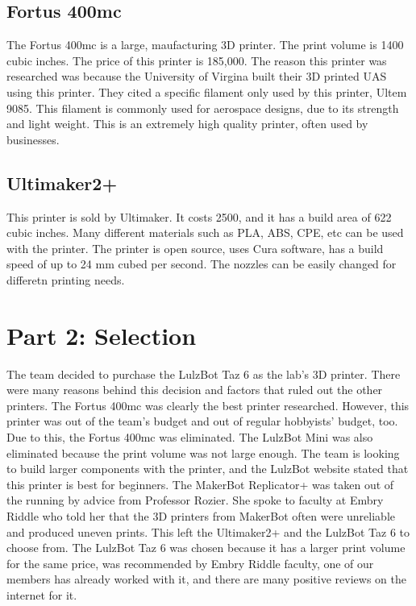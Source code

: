 \documentclass{article}
\begin{document}
\subsection*{Fortus 400mc}
The Fortus 400mc is a large, maufacturing 3D printer. The print volume is 1400 cubic inches. The price of this printer is 185,000. The reason this printer was researched was because the University of Virgina built their 3D printed UAS using this printer. They cited a specific filament only used by this printer, Ultem 9085. This filament is commonly used for aerospace designs, due to its strength and light weight. This is an extremely high quality printer, often used by businesses. 

\subsection*{Ultimaker2+}
This printer is sold by Ultimaker. It costs 2500, and it has a build area of 622 cubic inches. Many different materials such as PLA, ABS, CPE, etc can be used with the printer. The printer is open source, uses Cura software, has a build speed of up to 24 mm cubed per second. The nozzles can be easily changed for differetn printing needs. 

\section*{Part 2: Selection}
The team decided to purchase the LulzBot Taz 6 as the lab's 3D printer. There were many reasons behind this decision and factors that ruled out the other printers. The Fortus 400mc was clearly the best printer researched. However, this printer was out of the team's budget and out of regular hobbyists' budget, too. Due to this, the Fortus 400mc was eliminated. The LulzBot Mini was also eliminated because the print volume was not large enough. The team is looking to build larger components with the printer, and the LulzBot website stated that this printer is best for beginners. The MakerBot Replicator+ was taken out of the running by advice from Professor Rozier. She spoke to faculty at Embry Riddle who told her that the 3D printers from MakerBot often were unreliable and produced uneven prints. This left the Ultimaker2+ and the LulzBot Taz 6 to choose from. The LulzBot Taz 6 was chosen because it has a larger print volume for the same price, was recommended by Embry Riddle faculty, one of our members has already worked with it, and there are many positive reviews on the internet for it. 
\end{document}
